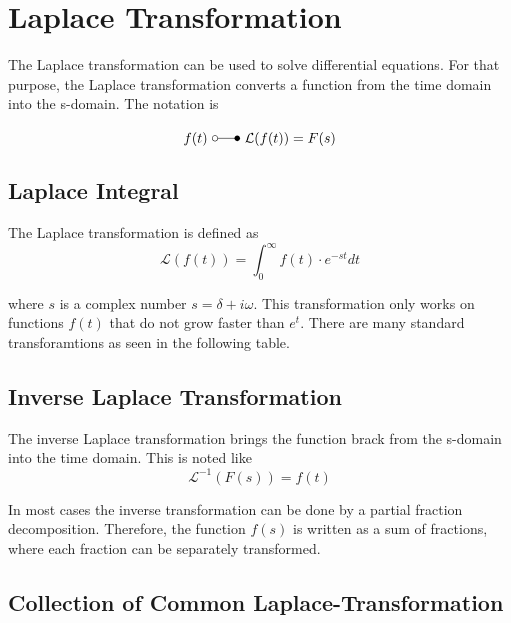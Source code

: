 \documentclass[./\jobname.tex]{subfiles}
\begin{document}
\chapter{Laplace Transformation}

The Laplace transformation can be used to solve differential equations. For that purpose, the Laplace transformation converts a function from the time domain into the s-domain.
The notation is 

\begin{equation}
	f(t) \text{ } \laplace \text{ } \mathcal{L}(f(t)) = F(s)
\end{equation}

\section{Laplace Integral}
The Laplace transformation is defined as 
\begin{equation}
	\mathcal{L} \left( f(t) \right) = \int_{0}^{\infty} f(t) \cdot e^{-st} dt
\end{equation}

where $s$ is a complex number $s = \delta + i \omega$. This transformation only works on functions $f(t)$ that do not grow faster than $e^t$. There are many standard transforamtions as seen in the following table. 

\section{Inverse Laplace Transformation}
The inverse Laplace transformation brings the function brack from the s-domain into the time domain. This is noted like 
\begin{equation}
	\mathcal{L}^{-1} \left(F(s)\right) = f(t)
\end{equation}

In most cases the inverse transformation can be done by a partial fraction decomposition. Therefore, the function $f(s)$ is written as a sum of fractions, where each fraction can be separately transformed. 

\section{Collection of Common Laplace-Transformation}
\end{document}
